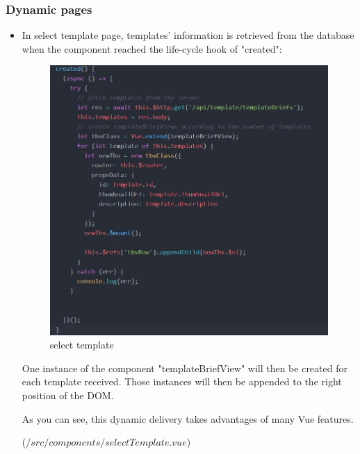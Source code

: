 \documentclass[11pt]{article}
\begin{document}
\begin{spacing}{1.0}
\begin{itemize}
	
	\end{itemize}
	
	
	\subsubsection{Dynamic pages}
	
	\begin{itemize}
	\item In select template page, templates' information is retrieved from the database when the component reached the life-cycle hook of "created":
	
				\begin{figure}[H]
	\centering
	\includegraphics[scale=0.5]{figures/dp/selectTemplate.jpg}
	\caption{select template}
\end{figure}
	
	One instance of the component "templateBriefView" will then be created for each template received. Those instances will then be appended to the right position of the DOM.
	
	As you can see, this dynamic delivery takes advantages of many Vue features. 
	
	($/src/components/selectTemplate.vue$)	
	

\end{itemize}
\end{spacing}
\end{document}
